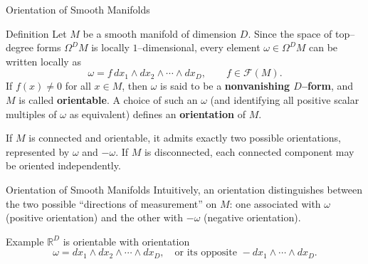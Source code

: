 \begin{frame}{Orientation of Smooth Manifolds}
\vspace{-0.1cm}
\begin{block}{Definition}
Let \(M\) be a smooth manifold of dimension \(D\).
Since the space of top–degree forms \(\Omega^D M\) is locally $1$–dimensional, every element \(\omega\in\Omega^D M\) can be written locally as
\vspace{-0.2cm}
\[
\omega=f\,dx_1\wedge dx_2\wedge\cdots\wedge dx_D,\qquad f\in\mathcal{F}(M).
\]
If \(f(x)\neq 0\) for all \(x\in M\), then \(\omega\) is said to be a \textbf{nonvanishing $D$–form}, and \(M\) is called \textbf{orientable}.
A choice of such an $\omega$ (and identifying all positive scalar multiples of $\omega$ as equivalent) defines an \textbf{orientation} of \(M\).

If \(M\) is connected and orientable, it admits exactly two possible orientations, represented by \(\omega\) and \(-\omega\).
If \(M\) is disconnected, each connected component may be oriented independently.

\end{block}

\end{frame}

\begin{frame}{Orientation of Smooth Manifolds}
Intuitively, an orientation distinguishes between the two possible “directions of measurement” on \(M\): one associated with $\omega$ (positive orientation) and the other with $-\omega$ (negative orientation).
\begin{block}{Example}
\(\mathbb{R}^D\) is orientable with orientation
\[
\omega=dx_1\wedge dx_2\wedge\cdots\wedge dx_D,
\quad \text{or its opposite } -dx_1\wedge\cdots\wedge dx_D.
\]
\end{block}

\begin{center}
\end{center}
\end{frame}

